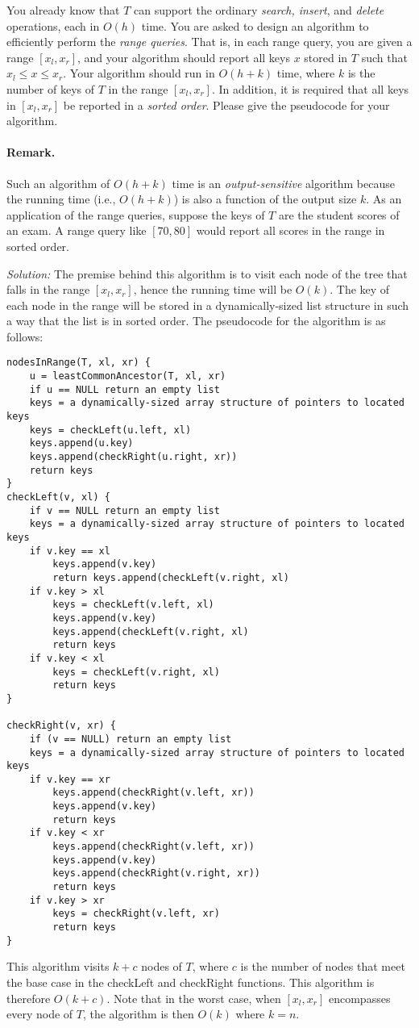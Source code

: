 \documentclass[11pt]{article}
\begin{document}
\begin{enumerate}
You already know that $T$ can support the ordinary {\em search, insert}, and {\em delete} operations, each in $O(h)$ time. You are asked to design an algorithm to efficiently perform the {\em range queries}. That is, in each range query, you are given a range $[x_l,x_r]$, and your algorithm should report all keys $x$ stored in $T$ such that $x_l\leq x\leq x_r$. Your algorithm should run in $O(h+k)$ time, where $k$ is the number of keys of $T$ in the range $[x_l,x_r]$. In addition, it is required that all keys in $[x_l,x_r]$ be reported in a {\em sorted order}. Please give the pseudocode for your algorithm.

\vspace{-0.13in}
\paragraph{Remark.} Such an algorithm of $O(h+k)$ time is an {\em output-sensitive} algorithm because the running time (i.e., $O(h+k)$) is also a function of the output size $k$.
As an application of the range queries, suppose the keys of $T$ are the student scores of an exam. A range query like $[70,80]$ would report all scores in the range in sorted order.

\textit{Solution:} The premise behind this algorithm is to visit each node of the tree that falls in the range $[x_l,x_r]$, hence the running time will be $O(k)$. The key of each node in the range will be stored in a dynamically-sized list structure in such a way that the list is in sorted order. The pseudocode for the algorithm is as follows:
\newpage
\begin{verbatim}
nodesInRange(T, xl, xr) {
    u = leastCommonAncestor(T, xl, xr)
    if u == NULL return an empty list
    keys = a dynamically-sized array structure of pointers to located keys
    keys = checkLeft(u.left, xl)
    keys.append(u.key)
    keys.append(checkRight(u.right, xr))
    return keys
}
checkLeft(v, xl) {
    if v == NULL return an empty list
    keys = a dynamically-sized array structure of pointers to located keys
    if v.key == xl
        keys.append(v.key)
        return keys.append(checkLeft(v.right, xl)
    if v.key > xl
        keys = checkLeft(v.left, xl)
        keys.append(v.key)
        keys.append(checkLeft(v.right, xl)
        return keys
    if v.key < xl
        keys = checkLeft(v.right, xl)
        return keys
}

checkRight(v, xr) {
    if (v == NULL) return an empty list
    keys = a dynamically-sized array structure of pointers to located keys
    if v.key == xr
        keys.append(checkRight(v.left, xr))
        keys.append(v.key)
        return keys
    if v.key < xr
        keys.append(checkRight(v.left, xr))
        keys.append(v.key)
        keys.append(checkRight(v.right, xr))
        return keys
    if v.key > xr
        keys = checkRight(v.left, xr)
        return keys
}
\end{verbatim}
This algorithm visits $k + c$ nodes of $T$, where $c$ is the number of nodes that meet the base case in the checkLeft and checkRight functions. This algorithm is therefore $O(k + c)$. Note that in the worst case, when $[x_l,x_r]$ encompasses every node of $T$, the algorithm is then $O(k)$ where $k=n$.


\end{enumerate}
\end{document}
